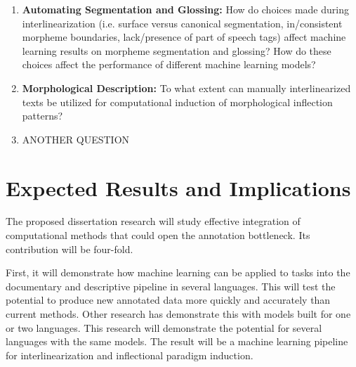 \begin{enumerate}
\item{} \textbf{Automating Segmentation and Glossing:} How do choices made during interlinearization (i.e. surface versus canonical segmentation, in/consistent morpheme boundaries, lack/presence of part of speech tags) affect machine learning results on morpheme segmentation and glossing? How do these choices affect the performance of different machine learning models?


\item{} \textbf{Morphological Description:} To what extent can manually interlinearized texts be utilized for computational induction of morphological inflection patterns?

\item ANOTHER QUESTION

\end{enumerate}

\section{Expected Results and Implications}

The proposed dissertation research will study effective integration of computational methods that could open the annotation bottleneck. 
Its contribution will be four-fold. 

First, it will demonstrate how machine learning can be applied to tasks into the documentary and descriptive pipeline in several languages. This will test the potential to produce new annotated data more quickly and accurately than current methods. Other research has demonstrate this with models built for one or two languages. This research will demonstrate the potential for several languages with the same models. The result will be a machine learning pipeline for interlinearization and inflectional paradigm induction.

